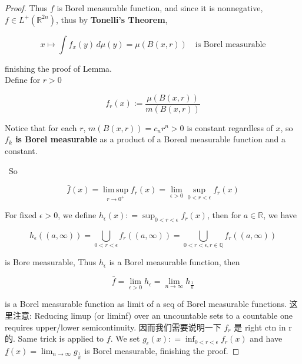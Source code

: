 \documentclass{qlnotes-export}
\begin{document}
\begin{proof}
Thus \(f\) is Borel measurable function, and since it is nonnegative, \(f \in L^{+}({\mathbb{R}}^{2n})\), thus by \textbf{Tonelli's Theorem},

\[x\mapsto\int f_{x}(y)\, d\mu(y) = \mu(B(x,r))\quad\text{is Borel measurable}\]

finishing the proof of Lemma.\\
Define for \(r > 0\)

\[f_{r}(x) := \frac{\mu(B\left( {x,r} \right))}{m(B\left( {x,r} \right))}\]

Notice that for each \(r\), \(m(B(x,r)) = c_{n}r^{n} > 0\) is constant regardless of \(x\), so \textbf{\(f_{k}\) is Borel measurable} as a product of a Boreal measurable function and a constant.\\
\strut ~So

\[\bar{f}(x) = \operatorname{lim\, sup}\limits_{r\rightarrow 0^{+}}f_{r}(x) = \lim\limits_{\epsilon > 0}\sup\limits_{0 < r < \epsilon}f_{r}(x)\]

For fixed \(\epsilon > 0\), we define \(h_{\epsilon}(x): = \sup_{0 < r < \epsilon}f_{r}(x)\), then for \(a \in {\mathbb{R}}\), we have

\[h_{\epsilon}((a,\infty)) = \bigcup\limits_{0 < r < \epsilon}f_{r}((a,\infty)) = \bigcup\limits_{0 < r < \epsilon,r \in {\mathbb{Q}}}f_{r}((a,\infty))\]

is Bore measurable, Thus \(h_{\epsilon}\) is a Borel measurable function, then

\[\bar{f} = \lim\limits_{\epsilon > 0}h_{\epsilon} = \lim\limits_{n\rightarrow\infty}h_{\frac{1}{n}}\]

is a Borel measurable function as limit of a seq of Borel measurable functions. 这里注意: Reducing limup (or liminf) over an uncountable sets to a countable one requires upper/lower semicontinuity. 因而我们需要说明一下 \(f_{r}\) 是 right ctn in r 的. Same trick is applied to \(\underset{¯}{f}\). We set \(g_{\epsilon}(x): = \inf_{0 < r < \epsilon}f_{r}(x)\) and have \(\underset{¯}{f}(x) = \lim_{n\rightarrow\infty}g_{\frac{1}{n}}\) is Borel measurable, finishing the proof.

\end{proof}
\end{document}
